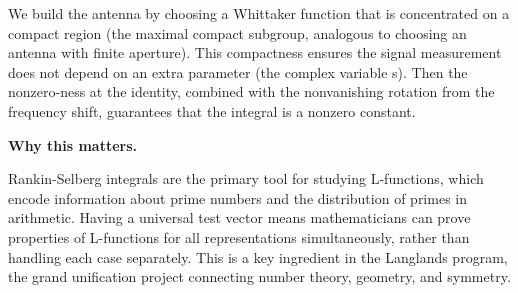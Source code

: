 We build the antenna by choosing a Whittaker function that is
concentrated on a compact region (the maximal compact subgroup,
analogous to choosing an antenna with finite aperture). This
compactness ensures the signal measurement does not depend on an
extra parameter (the complex variable s). Then the nonzero-ness at
the identity, combined with the nonvanishing rotation from the
frequency shift, guarantees that the integral is a nonzero constant.

\textbf{Why this matters.}

Rankin-Selberg integrals are the primary tool for studying
L-functions, which encode information about prime numbers and
the distribution of primes in arithmetic. Having a universal test
vector means mathematicians can prove properties of L-functions
for all representations simultaneously, rather than handling each
case separately. This is a key ingredient in the Langlands program,
the grand unification project connecting number theory, geometry,
and symmetry.
